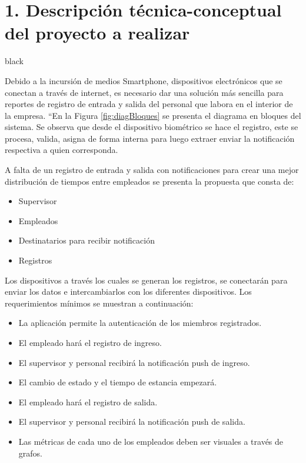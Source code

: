 \documentclass[
11pt, %
]{charter}
\begin{document}
\section{1. Descripción técnica-conceptual del proyecto a realizar}
\label{sec:descripcion}


\begin{consigna}{black} %

Debido a la incursión de medios Smartphone, dispositivos electrónicos que se conectan a través de internet, es necesario dar una solución más sencilla para reportes de registro de entrada y salida del personal que labora en el interior de la empresa. ``En la Figura \ref{fig:diagBloques} se presenta el diagrama en bloques del sistema. Se observa que desde el dispositivo biométrico se hace el registro, este se procesa, valida, asigna de forma interna para luego extraer  enviar la notificación respectiva a quien corresponda.

A falta de un registro de entrada y salida con notificaciones para crear una mejor distribución de tiempos entre empleados se presenta la propuesta que consta de:

\begin{itemize}
	\item Supervisor
	\item Empleados
	\item Destinatarios para recibir notificación
	\item Registros
\end{itemize}

Los dispositivos a través los cuales se generan los registros, se conectarán para enviar los datos e intercambiarlos con los diferentes dispositivos. Los requerimientos mínimos se muestran a continuación:

\begin{itemize}
	\item La aplicación permite la autenticación de los miembros registrados.
	\item El empleado hará el registro de ingreso.
	\item El supervisor y personal recibirá la notificación push de ingreso.
	\item El cambio de estado y el tiempo de estancia empezará.
	\item El empleado hará el registro de salida.
	\item El supervisor y personal recibirá la notificación push de salida.
	\item Las métricas de cada uno de los empleados deben ser visuales a través de grafos.
\end{itemize}


\end{consigna}
\end{document}

